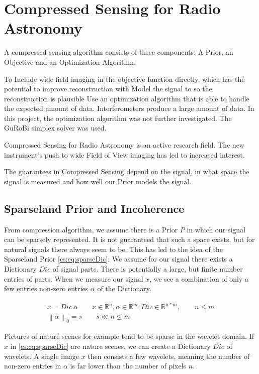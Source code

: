 \section{Compressed Sensing for Radio Astronomy} \label{cs}
A compressed sensing algorithm consists of three components: A Prior, an Objective and an Optimization Algorithm. 

To Include wide field imaging in the objective function directly, which has the potential to improve reconstruction with 
Model the signal to so the reconstruction is plausible
Use an optimization algorithm that is able to handle the expected amount of data. Interferometers produce a large amount of data. In this project, the optimization algorithm was not further investigated. The GuRoBi simplex solver was used.

Compressed Sensing for Radio Astronomy is an active research field. The new instrument's push to wide Field of View imaging has led to increased interest. 

The guarantees in Compressed Sensing depend on the signal, in what space the signal is measured and how well our Prior models the signal. 


\subsection{Sparseland Prior and Incoherence}
From compression algorithm, we assume there is a Prior $P$ in which our signal can be sparsely represented. It is not guaranteed that such a space exists, but for natural signals there always seem to be. This has led to the idea of the Sparseland Prior \eqref{cs:eq:sparseDic}: We assume for our signal there exists a Dictionary $Dic$ of signal parts. There is potentially a large, but finite number entries of parts. When we measure our signal $x$, we see a combination of only a few entries non-zero entries $\alpha$ of the Dictionary. 

\begin{equation} \label{cs:eq:sparseDic}
	\begin{split}
		x = Dic \: \alpha  \qquad  x \in \mathbb{R}^{n}, \alpha \in \mathbb{R}^{m}, Dic \in \mathbb{R}^{n*m}, \qquad n \leq m \\
		\left \| \alpha \right \|_0 = s \qquad s \ll n \leq m
	\end{split}
\end{equation}

Pictures of nature scenes for example tend to be sparse in the wavelet domain. If $x$ in \eqref{cs:eq:sparseDic} are nature scenes, we can create a Dictionary $Dic$ of wavelets. A single image $x$ then consists a few wavelets, meaning the number of non-zero entries in $\alpha$ is far lower than the number of pixels $n$.

